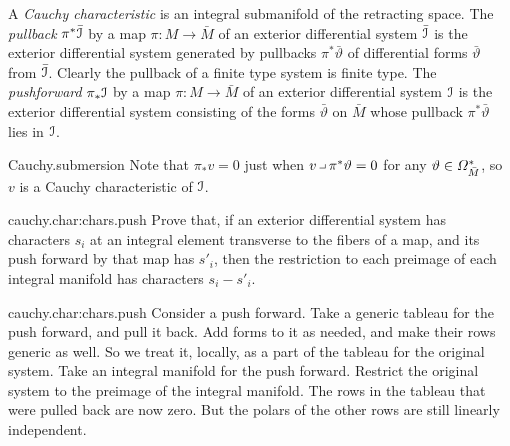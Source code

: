 A \emph{Cauchy characteristic} is an integral submanifold of the retracting space.
The \emph{pullback} \(\pi^*\bar{\mathcal{I}}\) by a map \(\pi \colon M \to \bar{M}\) of an exterior differential system \(\bar{\mathcal{I}}\) is the exterior differential system generated by pullbacks \(\pi^*\bar\vartheta\) of differential forms \(\bar\vartheta\) from \(\bar{\mathcal{I}}\).
Clearly the pullback of a finite type system is finite type.
The \emph{pushforward} \(\pi_*\mathcal{I}\) by a map \(\pi \colon M \to \bar{M}\) of an exterior differential system \(\mathcal{I}\) is the exterior differential system consisting of the forms \(\bar\vartheta\) on \(\bar{M}\) whose pullback \(\pi^*\bar\vartheta\) lies in \(\mathcal{I}\).
%
\begin{answer}{Cauchy.submersion}%
Note that \(\pi_* v=0\) just when \(v \hook \pi^*\vartheta=0\) for any \(\vartheta\in \Omega^{*}_{\bar{M}}\), so  \(v\) is a Cauchy characteristic of \(\mathcal{I}\).%
\end{answer}
\begin{problem}{cauchy.char:chars.push}
Prove that, if an exterior differential system has characters \(s_i\) at an integral element transverse to the fibers of a map, and its push forward by that map has \(s'_i\), then the restriction to each preimage of each integral manifold has characters \(s_i-s'_i\).
\end{problem}
\begin{answer}{cauchy.char:chars.push}
Consider a push forward.
Take a generic tableau for the push forward, and pull it back.
Add forms to it as needed, and make their rows generic as well.
So we treat it, locally, as a part of the tableau for the original system.
Take an integral manifold for the push forward.
Restrict the original system to the preimage of the integral manifold. 
The rows in the tableau that were pulled back are now zero.
But the polars of the other rows are still linearly independent.
\end{answer}
